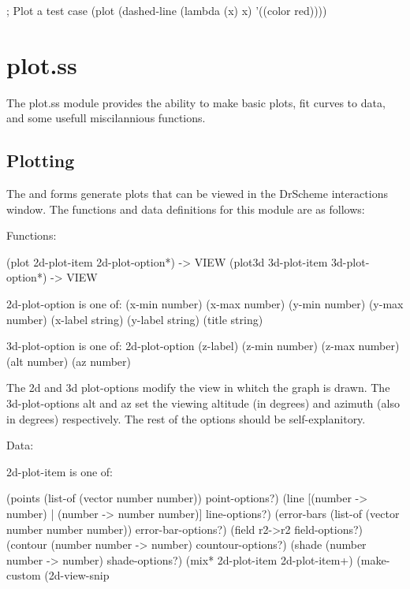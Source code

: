 \documentclass{article}
\begin{document}
{{{\begin{schemedisplay}
; Plot a test case
(plot (dashed-line (lambda (x) x) '((color red))))
\end{schemedisplay}

\pagebreak

\section{plot.ss}


The plot.ss module provides the ability to make basic plots, fit curves to data, and some usefull miscilannious functions.

\subsection{Plotting}


The  and  forms generate plots that can be viewed in the DrScheme interactions window. The functions and data definitions for this  module are as follows:



\begin{schemedisplay}

       
Functions:
       
 (plot 2d-plot-item 2d-plot-option*) -> VIEW
 (plot3d 3d-plot-item 3d-plot-option*) -> VIEW
     
2d-plot-option is one of:
 (x-min number)
 (x-max number)
 (y-min number)
 (y-max number)
 (x-label string)
 (y-label string)
 (title string)
     
3d-plot-option is one of:
 2d-plot-option
 (z-label)
 (z-min number)
 (z-max number)
 (alt number)
 (az number) 
     
\end{schemedisplay}



The 2d and 3d plot-options modify the view in whitch the graph is drawn. The 3d-plot-options alt and az set the viewing altitude (in degrees) and azimuth (also in degrees) respectively. The rest of the options should be self-explanitory.



\begin{schemedisplay}

Data:
     
2d-plot-item is one of:

 (points (list-of (vector number number)) point-options?)
 (line [(number -> number) | (number -> number number)] line-options?)
 (error-bars (list-of (vector number number number)) error-bar-options?)
 (field r2->r2 field-options?)
 (contour (number number -> number) countour-options?)
 (shade (number number -> number) shade-options?)
 (mix* 2d-plot-item 2d-plot-item+)
 (make-custom (2d-view-snip%
     

\end{schemedisplay}}}}
\end{document}
